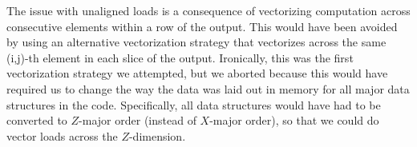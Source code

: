 The issue with unaligned loads is a consequence of vectorizing
computation across consecutive elements within a row of the output. This
would have been avoided by using an alternative vectorization strategy
that vectorizes across the same (i,j)-th element in each slice of the
output. Ironically, this was the first vectorization strategy we
attempted, but we aborted because this would have required us to change
the way the data was laid out in memory for all major data structures in
the code. Specifically, all data structures would have had to be
converted to $Z$-major order (instead of $X$-major order), so that we
could do vector loads across the $Z$-dimension.
